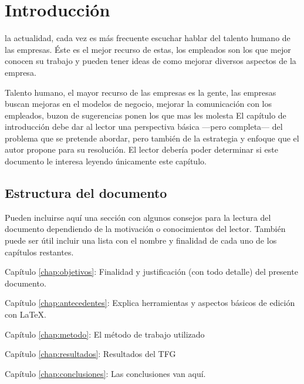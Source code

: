 \chapter{Introducción}

 la actualidad, cada vez es más frecuente escuchar hablar del talento humano de las empresas. Éste es el mejor recurso de estas,
 los empleados son los que mejor conocen su trabajo y pueden tener ideas de como mejorar diversos aspectos de la empresa. 


Talento humano, el mayor recurso de las empresas es la gente, 
las empresas buscan mejoras en el modelos de negocio, mejorar la comunicación con los empleados, buzon de sugerencias ponen los que mas les molesta
El capítulo de introducción debe dar al lector una perspectiva básica ---pero
completa--- del problema que se pretende abordar, pero también de la estrategia
y enfoque que el autor propone para su resolución. El lector debería poder
determinar si este documento le interesa leyendo únicamente este capítulo.


\section{Estructura del documento}

Pueden incluirse aquí una sección con algunos consejos para la lectura del
documento dependiendo de la motivación o conocimientos del lector.  También
puede ser útil incluir una lista con el nombre y finalidad de cada uno de los
capítulos restantes.

\begin{definitionlist}
\item[Capítulo \ref{chap:objetivos}: \nameref{chap:objetivos}] Finalidad y justificación
  (con todo detalle) del presente documento.
 \item[Capítulo \ref{chap:antecedentes}: \nameref{chap:antecedentes}] Explica herramientas
  y aspectos básicos de edición con \LaTeX.
  \item [Capítulo \ref{chap:metodo}: \nameref{chap:metodo}] El método de trabajo utilizado
  \item[Capítulo \ref{chap:resultados}: \nameref{chap:resultados}] Resultados del TFG
  \item[Capítulo \ref{chap:conclusiones}: \nameref{chap:conclusiones}] Las conclusiones van aquí.
\end{definitionlist}

